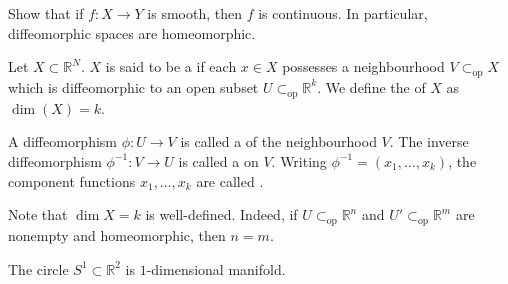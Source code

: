 \documentclass[12pt]{article}
\newcommand{\opsub}{\subset_{\operatorname{op}}}
\begin{document}
\begin{ex}
	Show that if $f : X \to Y$ is smooth, then $f$ is continuous. \newline
	In particular, diffeomorphic spaces are homeomorphic.
\end{ex}

\begin{defn}
	Let $X \subset \mathbb{R}^{N}$. $X$ is said to be a  if each $x \in X$ possesses a neighbourhood $V \opsub X$ which is diffeomorphic to an open subset $U \opsub \mathbb{R}^{k}$. We define the  of $X$ as $\dim(X) = k$.

	A diffeomorphism $\phi : U \to V$ is called a  of the neighbourhood $V$. The inverse diffeomorphism $\phi^{-1} : V \to U$ is called a  on $V$. \newline
	Writing $\phi^{-1} = (x_{1}, \ldots, x_{k})$, the component functions $x_{1}, \ldots, x_{k}$ are called .
\end{defn}

Note that $\dim X = k$ is well-defined. Indeed, if $U \opsub \mathbb{R}^{n}$ and $U' \opsub \mathbb{R}^{m}$ are nonempty and homeomorphic, then $n = m$.

\begin{ex}
	The circle $S^{1} \subset \mathbb{R}^{2}$ is $1$-dimensional manifold.
\end{ex}
\end{document}
